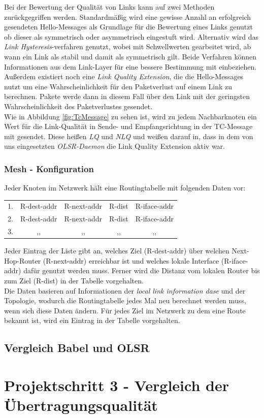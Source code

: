 \documentclass[10pt]{scrartcl}
\begin{document}
Bei der Bewertung der Qualität von Links kann auf zwei Methoden zurückgegriffen werden.
Standardmäßig wird eine gewisse Anzahl an erfolgreich gesendeten Hello-Messages als Grundlage für die Bewertung eines Links genutzt ob dieser als symmetrisch oder asymmetrisch eingestuft wird.
Alternativ wird das \textit{Link Hysteresis}-verfahren genutzt, wobei mit Schwellwerten gearbeitet wird, ab wann ein Link als stabil und damit als symmetrisch gilt.
Beide Verfahren können Informationen aus dem Link-Layer für eine bessere Bestimmung mit einbeziehen.
Außerdem existiert noch eine \textit{Link Quality Extension}, die die Hello-Messages nutzt um eine Wahrscheinlichkeit für den Paketverlust auf einem Link zu berechnen.
Pakete werde dann in diesem Fall über den Link mit der geringsten Wahrscheinlichkeit des Paketverlustes gesendet.\\
Wie in Abbildung \ref{fig:TcMessage} zu sehen ist, wird zu jedem Nachbarknoten ein Wert für die Link-Qualität in Sende- und Empfangsrichtung in der TC-Message mit gesendet.
Diese heißen \textit{LQ} und \textit{NLQ} und weißen darauf in, dass in dem von uns eingesetzten \textit{OLSR-Daemon} die Link Quality Extension aktiv war.

\subsubsection{Mesh - Konfiguration}
Jeder Knoten im Netzwerk hält eine Routingtabelle mit folgenden Daten vor:

\begin{tabular}{l c c c c}
1. & R-dest-addr & R-next-addr & R-dist & R-iface-addr \\
2. &  R-dest-addr & R-next-addr & R-dist & R-iface-addr \\
3. & ,, & ,, & ,, & ,, \\
\end{tabular}

Jeder Eintrag der Liste gibt an, welches Ziel (R-dest-addr) über welchen Next-Hop-Router (R-next-addr) erreichbar ist und welches lokale Interface (R-iface-addr) dafür genutzt werden muss. Ferner wird die Distanz vom lokalen Router bis zum Ziel (R-dist) in der Tabelle vorgehalten.\\
Die Daten basieren auf Informationen der \textit{local link information dase} und der Topologie, wodurch die Routingtabelle jedes Mal neu berechnet werden muss, wenn sich diese Daten ändern. Für jedes Ziel im Netzwerk zu dem eine Route bekannt ist, wird ein Eintrag in der Tabelle vorgehalten.


\subsection{Vergleich Babel und OLSR}


\section{Projektschritt 3 - Vergleich der Übertragungsqualität}
\end{document}
